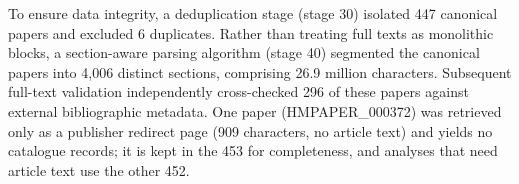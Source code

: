 \documentclass[referee,lineno,pdflatex,sn-vancouver-num]{sn-jnl}
\theoremstyle{thmstyleone}%
\theoremstyle{thmstyletwo}%
\theoremstyle{thmstylethree}%
\begin{document}
To ensure data integrity, a deduplication stage (stage 30) isolated 447
canonical papers and excluded 6 duplicates. Rather than treating full texts
as monolithic blocks, a section-aware parsing algorithm (stage 40) segmented
the canonical papers into 4,006 distinct sections, comprising 26.9 million
characters. Subsequent full-text validation independently cross-checked 296
of these papers against external bibliographic metadata. One paper
(HMPAPER\_000372) was retrieved only as a publisher redirect page (909
characters, no article text) and yields no catalogue records; it is kept in
the 453 for completeness, and analyses that need article text use the other
452.

\end{document}
